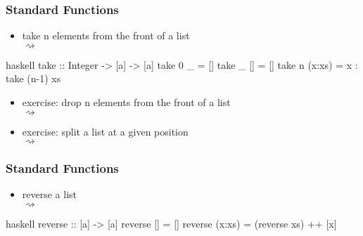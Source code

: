\documentclass[dvipsnames]{beamer}
\theoremstyle{plain}
\begin{document}
\begin{frame}[fragile]
  \frametitle{Standard Functions}

  \begin{itemize}
    \item take n elements from the front of a list\\
       $\rightsquigarrow$
  \end{itemize}

  \begin{exampleblock}{}
    \begin{pygments}{haskell}
take :: Integer -> [a] -> [a]
take 0 _      = []
take _ []     = []
take n (x:xs) = x : take (n-1) xs
    \end{pygments}
  \end{exampleblock}

  \pause
  \begin{itemize}
    \item exercise: drop n elements from the front of a list\\
       $\rightsquigarrow$
    \item exercise: split a list at a given position\\
       $\rightsquigarrow$
  \end{itemize}
\end{frame}

\begin{frame}[fragile]
  \frametitle{Standard Functions}

  \begin{itemize}
    \item reverse a list\\
       $\rightsquigarrow$
  \end{itemize}

  \begin{exampleblock}{}
    \begin{pygments}{haskell}
reverse :: [a] -> [a]
reverse []     = []
reverse (x:xs) = (reverse xs) ++ [x]
    \end{pygments}
  \end{exampleblock}
\end{frame}
\end{document}
